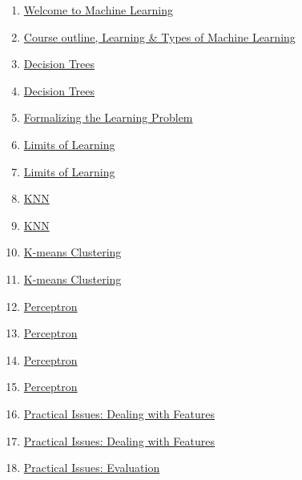 \documentclass[11pt]{article}
\begin{document}
\begin{enumerate}
	\item  \href{https://mp.weixin.qq.com/s/IDllktUf-otdMWGJDlfnIA}{Welcome to Machine Learning} %
	\item  \href{https://mp.weixin.qq.com/s/ax3Bs2AAJ_WzG_7CfvG1Pg}{Course outline, Learning \& Types of Machine Learning} %
	\item  \href{https://mp.weixin.qq.com/s/us-rPbuzJKFWorwRGB9ATQ}{Decision Trees } %
	\item  \href{https://mp.weixin.qq.com/s/1MJFE51j6Q18-mOrOgg8uQ}{Decision Trees } %
	\item  \href{https://mp.weixin.qq.com/s/os5ALySEnKwrd7aGbAlvHA}{Formalizing the Learning Problem} %
	\item  \href{https://mp.weixin.qq.com/s/bNnYHpBmpE1HblSov5gncA}{Limits of Learning } %
	\item  \href{https://mp.weixin.qq.com/s/M6muzZIfvDUo-Ek6xekn6w}{Limits of Learning } %
	\item  \href{https://mp.weixin.qq.com/s/ZXfQYCaDx3uG69IztGHs3A}{KNN } %
	\item  \href{https://mp.weixin.qq.com/s/nknvTlXAamiwh2L0NUnX4A}{KNN } %
	\item  \href{https://mp.weixin.qq.com/s/0QRwFVU77Lwkm8tiQjDsdQ}{K-means Clustering } %
	\item  \href{https://mp.weixin.qq.com/s/j35HiWQyJQZJHWAnli6tLA}{K-means Clustering } %
	\item  \href{https://mp.weixin.qq.com/s/paxcX52FDM0FX-F3mN2k6A}{Perceptron } %
	\item  \href{https://mp.weixin.qq.com/s/_5dHLPZYKsa9Y5LZkDSUeA}{Perceptron } %
	\item  \href{https://mp.weixin.qq.com/s/AY9vSG9cQsY2CNGnzwoR7g}{Perceptron } %
	\item  \href{https://mp.weixin.qq.com/s/aomugwa0ZqYr01neJ8sdow}{Perceptron } %
	\item  \href{https://mp.weixin.qq.com/s/hUN0bMO9l1vANTRVjLkBww}{Practical Issues: Dealing with Features } %
	\item  \href{https://mp.weixin.qq.com/s/OFm9hUsY0TkA2PSqUoEQdg}{Practical Issues: Dealing with Features } %
	\item  \href{https://mp.weixin.qq.com/s/i5eaU_K4tvcClQfEgbOcUQ}{Practical Issues: Evaluation } %

\end{enumerate}
\end{document}
